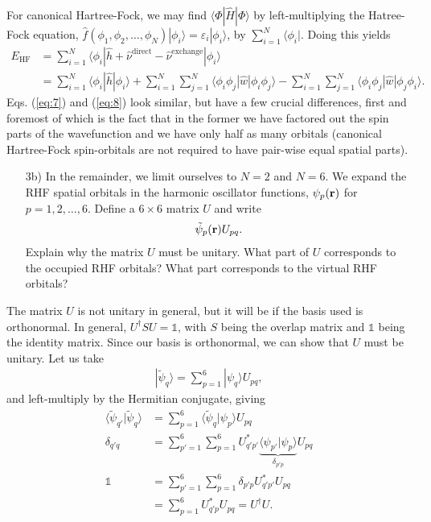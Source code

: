 \documentclass[a4paper]{article}
\newcommand{\nn}{\nonumber}
\begin{document}
For canonical Hartree-Fock, we may find $\langle \Phi | \hat{H} | \Phi\rangle$ by left-multiplying the Hatree-Fock equation, $\hat{f}(\phi_1,\phi_2,\dots,\phi_N)|\phi_i\rangle = \varepsilon_i |\phi_i\rangle$, by $\sum_{i=1}^N\langle \phi_i|$. Doing this yields 
\begin{align}
E_\text{HF} &= \sum_{i=1}^N\langle \phi_i|\hat{h}+\hat{\nu}^\text{direct} - \hat{\nu}^\text{exchange}|\phi_i\rangle \nn\\
&= \sum_{i=1}^N\langle \phi_i|\hat{h}|\phi_i\rangle + \sum_{i=1}^N\sum_{j=1}^N\langle \phi_i\phi_j|\hat{w}|\phi_i\phi_j\rangle - \sum_{i=1}^N\sum_{j=1}^N\langle \phi_i\phi_j|\hat{w}|\phi_j\phi_i\rangle. \label{eq:8}
\end{align}
Eqs. (\ref{eq:7}) and (\ref{eq:8}) look similar, but have a few crucial differences, first and foremost of which is the fact that in the former we have factored out the spin parts of the wavefunction and we have only half as many orbitals (canonical Hartree-Fock spin-orbitals are not required to have pair-wise equal spatial parts).

\begin{exframe}
\begin{itemize}
  \item[3b)] In the remainder, we limit ourselves to $N=2$ and $N=6$. We expand the RHF spatial orbitals in the harmonic oscillator functions, $\psi_p({\bf r})$ for $p=1,2,\dots,6$. Define a $6\times6$ matrix $U$ and write
  \begin{align}
  \tilde{\psi}_p({\bf r})U_{pq}. \label{eq:9}
  \end{align}
  Explain why the matrix $U$ must be unitary. What part of $U$ corresponds to the occupied RHF orbitals? What part corresponds to the virtual RHF orbitals?
\end{itemize}
\end{exframe}
The matrix $U$ is not unitary in general, but it will be if the basis used is orthonormal. In general, $U^\dagger S U = \mathbb{1}$, with $S$ being the overlap matrix and $\mathbb{1}$ being the identity matrix. Since our basis is orthonormal, we can show that $U$ must be unitary. Let us take 
\begin{align}
|\tilde{\psi}_q\rangle = \sum_{p=1}^6 |{\psi}_q\rangle U_{pq},
\end{align}
and left-multiply by the Hermitian conjugate, giving
\begin{align}
\langle \tilde{\psi}_{q'}|\tilde{\psi}_q\rangle &= \sum_{p=1}^6 \langle\tilde{\psi}_{q}|{\psi}_p\rangle U_{pq} \nn\\
\delta_{q'q} &=\sum_{p'=1}^6\sum_{p=1}^6 U^*_{q'p'}\underbrace{\langle\psi_{p'}|{\psi}_p\rangle}_{\delta_{p'p}} U_{pq} \nn\\
 \mathbb{1} &= \sum_{p'=1}^6\sum_{p=1}^6 \delta_{p'p} U^*_{q'p'} U_{pq} \nn\\
 &= \sum_{p=1}^6 U^*_{q'p}U_{pq} = U^\dagger U.
\end{align}
\end{document}
